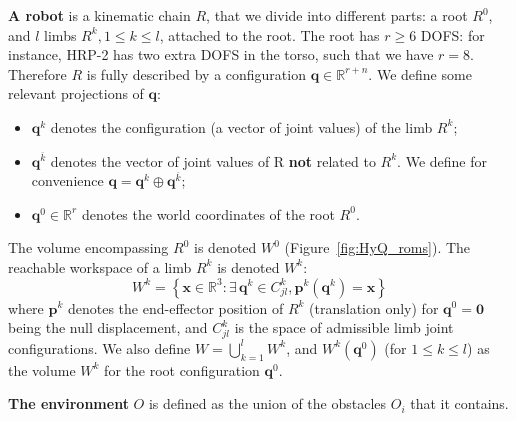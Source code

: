 \medskip
\textbf{A robot} is a kinematic chain $R$, that we divide into different parts: a root $R^0$, and $l$ limbs $R^k, 1 \leq k \leq l$, attached to the root.
The root has $r \geq 6$ DOFS: for instance, HRP-2 has two extra DOFS in the torso, such that we have $r=8$.
Therefore $R$ is fully described by a configuration $\mathbf{q} \in  \mathbb{R}^{r+n}$.
We define some relevant projections of $\mathbf{q}$:
\begin{itemize}
	\item $\mathbf{q}^k$ denotes the configuration (a vector of joint values) of the limb $R^k$; %
	\item $\mathbf{q}^{\overline{k}}$ denotes the vector of joint values of R \textbf{not} related to $R^k$. We define for convenience \mbox{$\mathbf{q}= \mathbf{q}^k \oplus \mathbf{q}^{\overline{k}}$}; %
	\item $\mathbf{q}^{0}\in \mathbb{R}^r$ denotes the world coordinates of the root $R^0$.
\end{itemize}

\medskip
The volume encompassing $R^0$ is denoted $W^0$ (Figure~\ref{fig:HyQ_roms}).
 The reachable workspace of a limb $R^k$ is denoted $W^k$: %
\begin{equation}
  W^k = \left\{ {\mathbf{x} \in \mathbb{R}^3: \exists \, \mathbf{q}^k \in C^k_{jl}, \mathbf{p}^k(\mathbf{q}^k) = \mathbf{x} } \right\}
\end{equation}
where $\mathbf{p}^k$ denotes the end-effector position of $R^k$ (translation only) for $\mathbf{q}^0 = \mathbf{0}$ being the null displacement, and  $C^k_{jl}$ is the space
of admissible limb joint configurations. We also define \mbox{$W = \bigcup_{k=1}^{l}W^k$}, and
$W^k(\mathbf{q}^{0})$ (for $1 \leq k \leq l$) as the volume $W^k$ for the root configuration $\mathbf{q}^{0}$.

\medskip
\textbf{The environment} $O$ is defined as the union of the obstacles $O_i$ that it contains.

